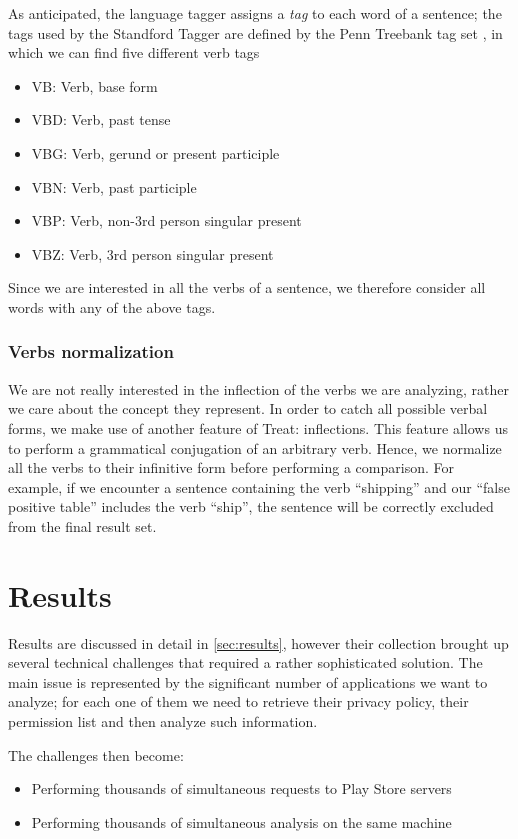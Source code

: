 As anticipated, the language tagger assigns a \emph{tag} to each word of a sentence; the tags used by the Standford Tagger are defined by the Penn Treebank tag set \cite{Marcus:1994:PTA:1075812.1075835}, in which we can find five different verb tags

\begin{itemize}
  \item VB:      Verb, base form
  \item VBD:     Verb, past tense
  \item VBG:     Verb, gerund or present participle
  \item VBN:     Verb, past participle
  \item VBP:     Verb, non-3rd person singular present
  \item VBZ:     Verb, 3rd person singular present 
\end{itemize}

Since we are interested in all the verbs of a sentence, we therefore consider all words with any of the above tags.

\subsubsection{Verbs normalization}
We are not really interested in the inflection of the verbs we are analyzing, rather we care about the concept they represent.
In order to catch all possible verbal forms, we make use of another feature of Treat: inflections. This feature allows us to perform a grammatical conjugation of an arbitrary verb.
Hence, we normalize all the verbs to their infinitive form before performing a comparison. For example, if we encounter a sentence containing the verb ``shipping'' and our ``false positive table'' includes the verb ``ship'', the sentence will be correctly excluded from the final result set.

\section{Results}
Results are discussed in detail in \autoref{sec:results}, however their collection brought up several technical challenges that required a rather sophisticated solution. The main issue is represented by the significant number of applications we want to analyze; for each one of them we need to retrieve their privacy policy, their permission list and then analyze such information.

The challenges then become:
\begin{itemize}
	\item Performing thousands of simultaneous requests to Play Store servers
	\item Performing thousands of simultaneous analysis on the same machine
\end{itemize}


